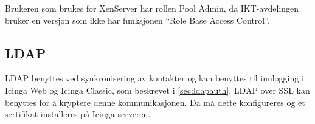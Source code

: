 Brukeren som brukes for XenServer har rollen Pool Admin, da IKT-avdelingen bruker en versjon som ikke har funksjonen ``Role Base Access Control''. 
\subsection{LDAP}
LDAP benyttes ved synkronisering av kontakter og kan benyttes til innlogging i Icinga Web og Icinga Classic, som beskrevet i \ref{sec:ldapauth}. LDAP over SSL kan benyttes for å kryptere denne kommunikasjonen. Da må dette konfigureres og et sertifikat installeres på Icinga-serveren.
